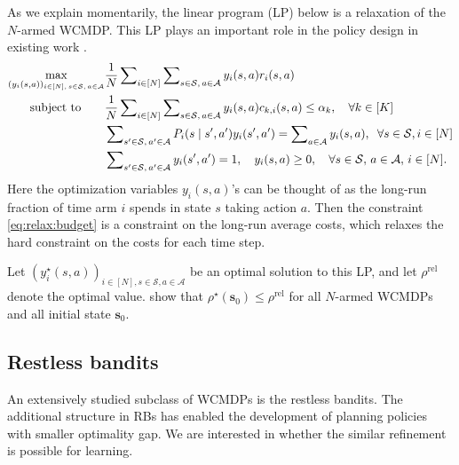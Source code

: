 \documentclass[mnsc,nonblindrev]{informs3}
\newcommand{\bms}{\bm{s}}
\newcommand{\rhorel}{\rho^{\mathrm{rel}}}
\newcommand{\States}{\mathcal{S}}
\newcommand{\Actions}{\mathcal{A}}
\begin{document}
As we explain momentarily, the linear program (LP) below is a relaxation of the $N$-armed WCMDP. This LP plays an important role in the policy design in existing work \citep{zhang2025projection}.
\begin{subequations}\label{eq:lprelax}
\vspace{-0.05cm}\begin{align}
\max_{(y_i(s,a))_{i\in[N],\,s\in\mathcal{S},\,a\in\mathcal{A}}}
  &\frac{1}{N} \sum\nolimits_{i\in[N]} \sum\nolimits_{s\in\mathcal{S},\,a\in\mathcal{A}} y_i(s,a) r_i(s,a)\label{eq:relax:obj} \\
\text{subject to} \qquad
&\frac{1}{N} \sum\nolimits_{i\in[N]} \sum\nolimits_{s\in\mathcal{S},\,a\in\mathcal{A}} 
    y_i(s,a) c_{k,i}(s,a) \leq \alpha_k, \quad \forall k\in[K] \label{eq:relax:budget} \\
&\sum\nolimits_{s'\in\mathcal{S},\,a'\in\mathcal{A}} P_i(s \mid s',a') y_i(s',a') 
   = \sum\nolimits_{a\in\mathcal{A}} y_i(s,a), \;\; \forall s\in\mathcal{S}, i\in[N] \label{eq:relax:flow} \\
&\sum\nolimits_{s'\in\mathcal{S},\,a'\in\mathcal{A}} y_i(s',a') = 1, \quad 
   y_i(s,a)\geq 0, \quad \forall s\in\mathcal{S},\,  a\in\mathcal{A},\, i\in[N].
 \label{eq:relax:nonneg}
\end{align}
\end{subequations}
Here the optimization variables $y_i(s, a)$'s can be thought of as the long-run fraction of time arm $i$ spends in state $s$ taking action $a$.
Then the constraint \eqref{eq:relax:budget} is a constraint on the long-run average costs, which relaxes the hard constraint on the costs for each time step.

Let $(y_i^\star(s,a))_{i\in[N],s\in\States,a\in\Actions}$ be an optimal solution to this LP, and let $\rhorel$ denote the optimal value.
\citet{zhang2025projection} show that $\rho^\star(\bms_0)\le \rhorel$ for all $N$-armed WCMDPs and all initial state $\bms_0$.





\subsection{Restless bandits}
\label{subsec:homogeneous-rb}

An extensively studied subclass of WCMDPs is the restless bandits. The additional structure in RBs has enabled the development of planning policies with smaller optimality gap. We are interested in whether the similar refinement is possible for learning.
\end{document}
